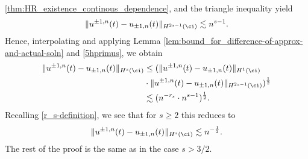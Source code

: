 \ref{thm:HR_existence_continous_dependence}, and the triangle inequality
yield
\begin{equation}
	\begin{split}
		\|u^{\pm 1, n} (t) - u_{\pm 1, n}(t)\|_{H^{2s - 1}(\ci)}
		\lesssim n^{s-1}.
		\label{5hprimus}
	\end{split}
\end{equation}
Hence, interpolating and applying Lemma
\ref{lem:bound_for_difference-of-approx-and-actual-soln} and
\eqref{5hprimus}, we obtain
			\begin{equation*}
				\begin{split}
					\|u^{\pm 1,n}(t) - u_{\pm 1, n}(t) \|_{H^s (\ci)}
					& \le ( \| u^{\pm 1,n}(t)
					- u_{\pm 1, n}(t) \|_{H^1 (\ci)}
					\\
					& \cdot \| u^{\pm 1,n}(t)
					- u_{\pm 1, n}(t)\|_{H^{2s-1}(\ci)} )^{\frac{1}{2}}
					\\
					& \lesssim (n^{-r_s} \cdot n^{s-1})^{\frac{1}{2}}.
				\end{split}
			\end{equation*}
			Recalling \eqref{r_s-definition}, we see that for $s \ge 2$ this reduces to
			\begin{equation}
				\begin{split}
					\|u^{\pm 1,n}(t) - u_{\pm 1, n}(t) \|_{H^s (\ci)} \lesssim
					n^{-\frac{1}{2}}.
					\label{10v}
				\end{split}
			\end{equation}
%
The rest of the proof is the same as in the case $s>3/2$.
%
%
%	
%
%
%
%
%
%


